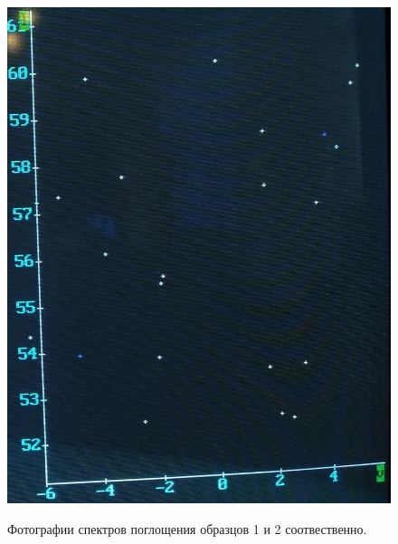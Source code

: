 \documentclass[a4paper,12pt]{article} %
\begin{document}
\begin{figure}[h!]
{\begin{subfloatrow}[2]
				{\includegraphics[scale=0.2]{graph2.jpg}{\label{pic2}}}         
		\end{subfloatrow}}
		{\caption{Фотографии спектров поглощения образцов 1 и 2 соотвественно.}}
	\end{figure}
\end{document}
